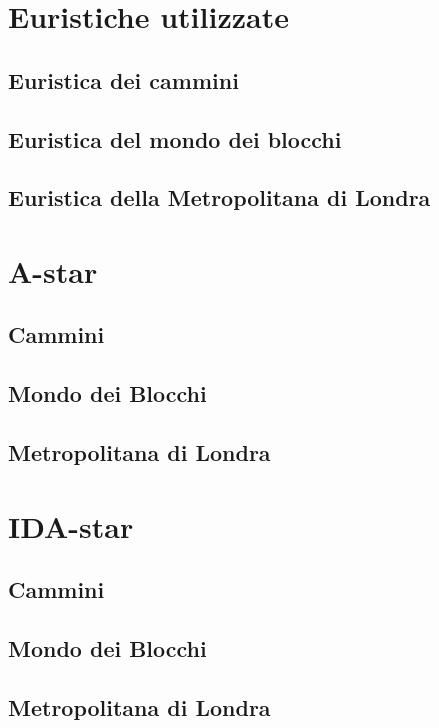 \section{Euristiche utilizzate}

\subsection{Euristica dei cammini}

\subsection{Euristica del mondo dei blocchi}

\subsection{Euristica della Metropolitana di Londra}

\section{A-star}

\subsection{Cammini}

\subsection{Mondo dei Blocchi}

\subsection{Metropolitana di Londra}
\section{IDA-star}

\subsection{Cammini}

\subsection{Mondo dei Blocchi}

\subsection{Metropolitana di Londra}
